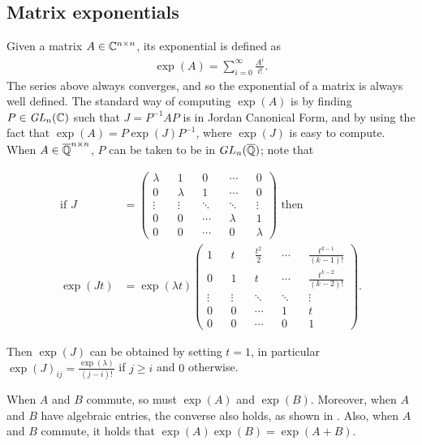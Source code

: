 \subsection{Matrix exponentials}

Given a matrix $A \in \mathbb{C}^{n \times n}$, its exponential is defined as
\begin{align*}
\exp(A) = \sum \limits_{i=0}^{\infty} \frac{A^{i}}{i!} .
\end{align*}
The series above always converges, and so the exponential of a matrix is always well defined. The standard way of computing $\exp(A)$ is by finding $P \in \mathit{GL}_{n}(\mathbb{C})$ such that $J=P^{-1}AP$ is in Jordan Canonical Form, and by using the fact that $\exp(A) = P \exp(J) P^{-1}$, where $\exp(J)$ is easy to compute. When $A \in \overline{\mathbb{Q}}^{n \times n}$, $P$ can be taken to be in $GL_{n}(\overline{\mathbb{Q}})$; note that

\begin{align*}
\mbox{if } J &= \begin{pmatrix}
\lambda && 1 && 0 && \cdots && 0 \\
0 && \lambda && 1 &&\cdots && 0 \\
\vdots && \vdots && \ddots && \ddots && \vdots \\
0 && 0 && \cdots && \lambda && 1 \\
0 && 0 && \cdots && 0 && \lambda
\end{pmatrix} \mbox{ then } \\
\exp(Jt) &= \exp(\lambda t) \begin{pmatrix}
1 && t && \frac{t^{2}}{2} && \cdots && \frac{t^{k-1}}{(k-1)!} \\
0 && 1 && t && \cdots && \frac{t^{k-2}}{(k-2)!} \\
\vdots && \vdots &&\ddots && \ddots && \vdots \\
0 && 0 && \cdots && 1 && t \\
0 && 0 && \cdots && 0 && 1
\end{pmatrix} .
\end{align*}

Then $\exp(J)$ can be obtained by setting $t=1$, in particular $\exp(J)_{ij} = \frac{\exp(\lambda)}{(j-i)!}$ if $j \geq i$ and $0$ otherwise.

When $A$ and $B$ commute, so must $\exp(A)$ and $\exp(B)$. Moreover, when $A$ and $B$ have algebraic entries, the converse also holds, as shown in \cite{MatrixExps}. Also, when $A$ and $B$ commute, it holds that $\exp(A)\exp(B) = \exp(A+B)$.


